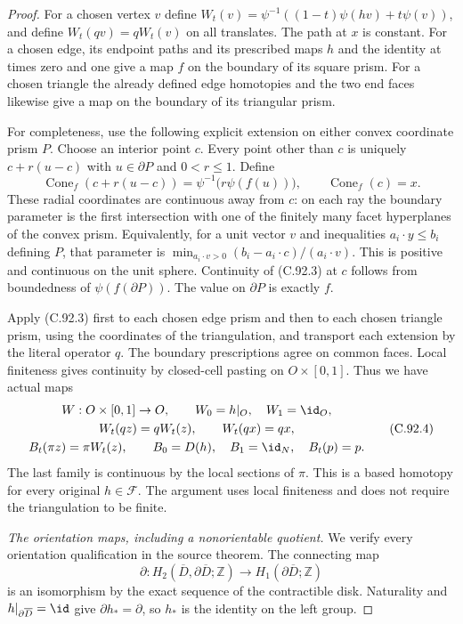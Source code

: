 \begin{proof}
For a chosen vertex $v$ define
$W_t(v)=\psi^{-1}((1-t)\psi(hv)+t\psi(v))$, and define
$W_t(qv)=qW_t(v)$ on all translates. The path at $x$ is constant.
For a chosen edge, its endpoint paths and its prescribed maps
$h$ and the identity at times zero and one give a map $f$ on the
boundary of its square prism. For a chosen triangle the already
defined edge homotopies and the two end faces likewise give a map
on the boundary of its triangular prism.

For completeness, use the following explicit extension on either
convex coordinate prism $P$. Choose an interior point $c$. Every
point other than $c$ is uniquely $c+r(u-c)$ with $u\in\partial P$
and $0<r\leq1$. Define
\[
 \operatorname{Cone}_f(c+r(u-c))
       =\psi^{-1}\bigl(r\psi(f(u))\bigr),
 \qquad \operatorname{Cone}_f(c)=x.                            \tag{C.92.3}
\]
These radial coordinates are continuous away from $c$: on each
ray the boundary parameter is the first intersection with one
of the finitely many facet hyperplanes of the convex prism.
Equivalently, for a unit vector $v$ and inequalities
$a_i\cdot y\leq b_i$ defining $P$, that parameter is
$\min_{a_i\cdot v>0}(b_i-a_i\cdot c)/(a_i\cdot v)$.
This is positive and continuous on the unit sphere.
Continuity of (C.92.3) at $c$ follows from boundedness of
$\psi(f(\partial P))$. The value on $\partial P$ is exactly $f$.

Apply (C.92.3) first to each chosen edge prism and then to each
chosen triangle prism, using the coordinates of the triangulation,
and transport each extension by the literal operator $q$.
The boundary prescriptions agree on common faces. Local finiteness
gives continuity by closed-cell pasting on $O\times[0,1]$.
Thus we have actual maps
\[
 \begin{gathered}
 W:O\times[0,1]\to O,\qquad W_0=h|_O,\quad W_1=\id_O,\\
 W_t(qz)=qW_t(z),\qquad W_t(qx)=qx,\\
 B_t(\pi z)=\pi W_t(z),\qquad
 B_0=D(h),\quad B_1=\id_N,\quad B_t(p)=p .
 \end{gathered}                                                \tag{C.92.4}
\]
The last family is continuous by the local sections of $\pi$.
This is a based homotopy for every original $h\in\mathscr F$.
The argument uses local finiteness and does not require the
triangulation to be finite.

\emph{The orientation maps, including a nonorientable quotient.}
We verify every orientation qualification in the source theorem.
The connecting map
\[
 \partial:H_2(\overline D,\partial\overline D;\mathbb Z)
             \longrightarrow H_1(\partial\overline D;\mathbb Z)
                                                               \tag{C.92.5}
\]
is an isomorphism by the exact sequence of the contractible disk.
Naturality and $h|_{\partial\overline D}=\id$ give
$\partial h_*=\partial$, so $h_*$ is the identity on the left group.


\end{proof}

